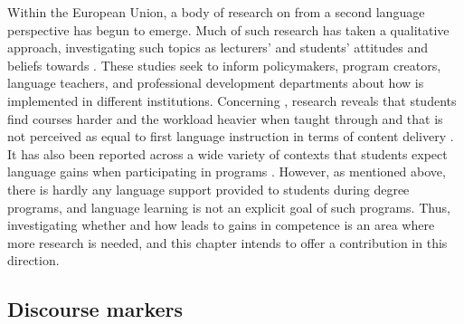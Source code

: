 \documentclass[output=paper]{langsci/langscibook}
\begin{document}
Within the European Union, a body of research on  from a second language  perspective has begun to emerge. Much of such research has taken a qualitative approach, investigating such topics as lecturers’ and students’ attitudes and beliefs towards  \citep{Kling2013,KuteevaAirey2014}. These studies seek to inform policymakers, program creators, language teachers, and professional development departments about how  is implemented in different institutions. Concerning , research reveals that students find courses harder and the workload heavier when taught through  \citep{Tazl2011} and that  is not perceived as equal to first language instruction in terms of content delivery \citep{Sert2008}. It has also been reported across a wide variety of contexts that students expect language gains when participating in  programs \citep{PecorariEtAl2011,Gundermann2014,LuegLueg2015,MargićŽeželić2015}. However, as mentioned above, there is hardly any language support provided to students during  degree programs, and language learning is not an explicit goal of such programs. Thus, investigating whether and how  leads to gains in  competence is an area where more research is needed, and this chapter intends to offer a contribution in this direction.



\subsection{Discourse markers}
\end{document}
